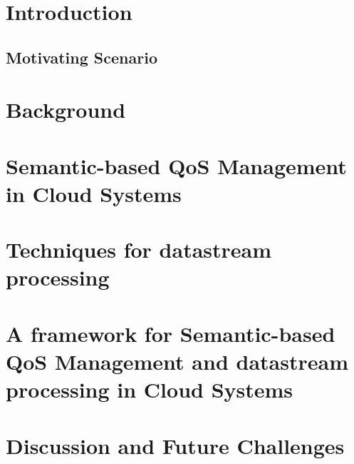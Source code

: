 \section{Introduction}

\subsection{Motivating Scenario}\label{motivating}

\section{Background}

\section{Semantic-based QoS Management in Cloud Systems}\label{qos-semantics}

\section{Techniques for datastream processing}\label{data-stream}

\section{A framework for Semantic-based QoS Management and datastream processing in Cloud Systems}\label{framework}

% 
\section{Discussion and Future Challenges}\label{discussion}

